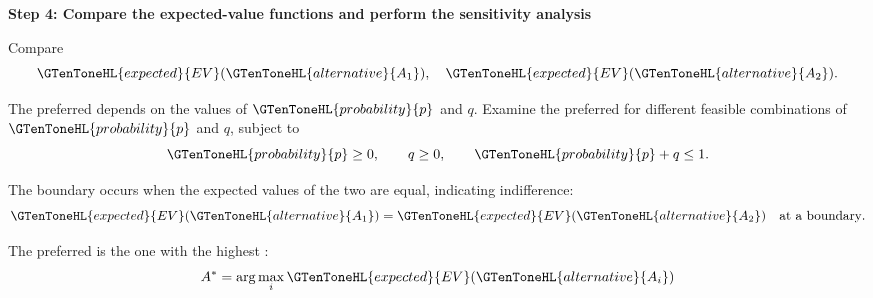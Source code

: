 	\setlength{\columnseprule}{0pt}
	
	\textbf{Step 4: Compare the expected-value functions and perform the sensitivity analysis}
	
	Compare
	$$
	\GTenToneHL{expected}{EV}(\GTenToneHL{alternative}{A_1}),\quad
	\GTenToneHL{expected}{EV}(\GTenToneHL{alternative}{A_2}).
	$$
	
	The preferred  depends on the values of $\GTenToneHL{probability}{p}$ and $q$. Examine
	the preferred  for different feasible combinations of $\GTenToneHL{probability}{p}$ and
	$q$, subject to
	$$
	\GTenToneHL{probability}{p}\geq0,\qquad q\geq0,\qquad \GTenToneHL{probability}{p}+q\leq1.
	$$
	
	The boundary occurs when the expected values of the two 
	are equal, indicating indifference:
	$$
	\GTenToneHL{expected}{EV}(\GTenToneHL{alternative}{A_1})=\GTenToneHL{expected}{EV}(\GTenToneHL{alternative}{A_2})
	\quad\text{at a boundary}.
	$$
	
	The preferred  is the one with the highest  :
	$$
	A^*=\arg\max_{i}\GTenToneHL{expected}{EV}(\GTenToneHL{alternative}{A_i})
	$$ \vspace{-10mm}

